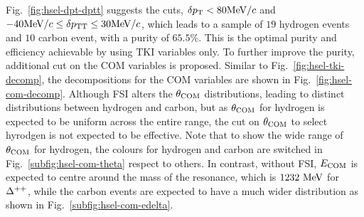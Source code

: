      Fig.~\ref{fig:hsel-dpt-dptt} suggests the cuts, $\delta p_\textrm{T} < 80\textrm{MeV}/c$ and $-40\textrm{MeV}/c \leq \delta p_\textrm{TT} \leq 30\textrm{MeV}/c$, which leads to a sample of $19$ hydrogen events and $10$ carbon event, with a purity of $65.5\%$.
     This is the optimal purity and efficiency achievable by using TKI variables only.
     To further improve the purity, additional cut on the COM variables is proposed.
     Similar to Fig.~\ref{fig:hsel-tki-decomp}, the decompositions for the COM variables are shown in Fig.~\ref{fig:hsel-com-decomp}.
     Although FSI alters the $\theta_{\textrm{COM}}$ distributions, leading to distinct distributions between hydrogen and carbon, but as $\theta_{\textrm{COM}}$ for hydrogen is expected to be uniform across the entire range, the cut on $\theta_{\textrm{COM}}$ to select hyrodgen is not expected to be effective.
     Note that to show the wide range of $\theta_{\textrm{COM}}$ for hydrogen, the colours for hydrogen and carbon are switched in Fig.~\ref{subfig:hsel-com-theta} respect to others.
     In contrast, without FSI, $E_{\textrm{COM}}$ is expected to centre around the mass of the resonance, which is $1232~\textrm{MeV}$ for $\Delta^{++}$, while the carbon events are expected to have a much wider distribution as shown in Fig.~\ref{subfig:hsel-com-edelta}.
